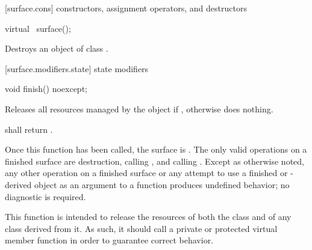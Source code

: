 %
%
 [surface.cons] { constructors, assignment operators, and destructors}

\begin{itemdecl}
virtual ~surface();
\end{itemdecl}
\begin{itemdescr}
\pnum
\effects
Destroys an object of class .
\end{itemdescr}

 [surface.modifiers.state] { state modifiers}

\begin{itemdecl}
void finish() noexcept;
\end{itemdecl}
\begin{itemdescr}
\pnum
\effects
Releases all resources managed by the  object  if , otherwise does nothing.

\pnum
\postconditions
{} shall return .

\pnum
\remarks
Once this function has been called, the surface is . The only valid operations on a finished surface are destruction, calling , and calling . Except as otherwise noted, any other operation on a finished surface or any attempt to use a finished  or -derived object as an argument to a function produces undefined behavior; no diagnostic is required.

\pnum
This function is intended to release the resources of both the  class and of any class derived from it. As such, it should call a private or protected virtual member function in order to guarantee correct behavior.
\end{itemdescr}

